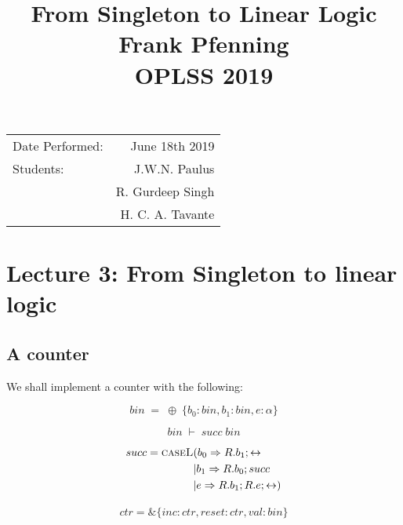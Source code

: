 \documentclass{article}
\title{From Singleton to Linear Logic \\ Frank Pfenning \\ OPLSS 2019} %
\begin{document}
	
	\maketitle %
	
	\begin{center}
		\begin{tabular}{l r}
			Date Performed: & June 18th 2019 \\ %
			Students: & J.W.N. Paulus  \\
			& R. Gurdeep Singh \\ %
			& H. C. A. Tavante
		\end{tabular}
	\end{center}
	
	
	\setcounter{section}{2} %
	\section{Lecture 3: From Singleton to linear logic}
	\subsection{A counter}
	
	We shall implement a counter with the following:
	
	\[
	\; bin\; =\; \oplus\; \{ b_0: bin, b_1:bin, e:\alpha \}\; 
	\]
	
	\[
	\; bin\; \vdash\; succ\; bin\; 
	\]
	
	\begin{align}
	succ = \textsc{caseL}&( b_0 \Rightarrow R . b_1; \leftrightarrow \\
	&| b_1 \Rightarrow R . b_0; succ \\
	&| e \Rightarrow R . b_1; R . e; \leftrightarrow )
	\end{align}
	
	\begin{equation}
	\begin{split}
	ctr = \& \{ inc:ctr, reset:ctr, val:bin \}
	\end{split}
	\end{equation}
	
\end{document}
